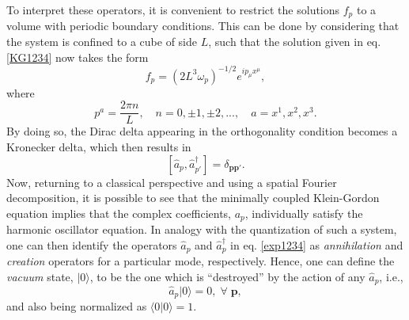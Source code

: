 \documentclass[
12pt,		%
openright,	%
twoside,  %
a4paper,			%
chapter=TITLE,		%
english,			%
french,				%
spanish,			%
brazil				%
]{USPSC-classe/USPSC}
\begin{document}
To interpret these operators, it is convenient to restrict the solutions $f_p$ to a volume with periodic boundary conditions. This can be done by considering that the system is confined to a cube of side $L$, such that the solution given in eq. \ref{KG1234} now takes the form
\begin{equation}
    f_p=(2L^3\omega_p)^{-1/2} e^{ip_{\mu}x^{\mu}},
\end{equation}
where
\begin{equation}
    p^{a}=\frac{2\pi n}{L},\quad n=0,\pm 1,\pm 2,...,\quad a=x^1,x^2,x^3.
\end{equation}
By doing so, the Dirac delta appearing in the orthogonality condition becomes a Kronecker delta, which then results in
\begin{equation}\label{inner25}
    [\hat{a}_p,\hat{a}^{\dag}_{p'}]=\delta_{\textbf{p}\textbf{p}'}.
\end{equation}
Now, returning to a classical perspective and using a spatial Fourier decomposition, it is possible to see that the minimally coupled Klein-Gordon equation implies that the complex coefficients, $a_p$, individually satisfy the harmonic oscillator equation. In analogy with the quantization of such a system, one can then identify the operators $\hat{a}_p$ and $\hat{a}_p^{\dag}$ in eq. \ref{exp1234} as \textit{annihilation} and \textit{creation} operators for a particular mode, respectively. Hence, one can define the \textit{vacuum} state, $|0\rangle$, to be the one which is ``destroyed'' by the action of any $\hat{a}_p$, i.e.,
\begin{equation}\label{vacuum}
    \hat{a}_p|0\rangle=0,\;\forall\;\textbf{p},
\end{equation}
and also being normalized as $\langle 0|0\rangle=1$. 
\end{document}
